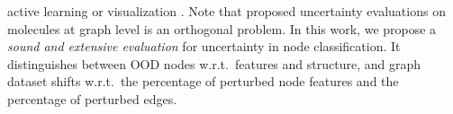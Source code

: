active learning \cite{Ng2018} or visualization \citep{Borovitskiy2020}. Note that proposed uncertainty evaluations on molecules at graph level \citep{Zhang2019, Ryu2019, Akita2018, uncertainty-nn-molecules, uncertainty-material-prediction} is an orthogonal problem. In this work, we propose a \emph{sound and extensive evaluation} for uncertainty in node classification. It distinguishes between OOD nodes w.r.t.\ features and structure, and graph dataset shifts w.r.t.\ the percentage of perturbed node features and the percentage of perturbed edges.
